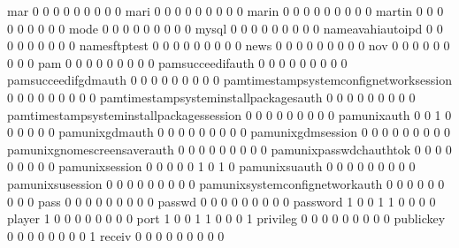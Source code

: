 \documentclass[compress,8pt]{beamer}
\begin{document}
\begin{frame}
\begin{Schunk}
  mar                                        0   0   0   0   0   0   0   0   0
  mari                                       0   0   0   0   0   0   0   0   0
  marin                                      0   0   0   0   0   0   0   0   0
  martin                                     0   0   0   0   0   0   0   0   0
  mode                                       0   0   0   0   0   0   0   0   0
  mysql                                      0   0   0   0   0   0   0   0   0
  nameavahiautoipd                           0   0   0   0   0   0   0   0   0
  namesftptest                               0   0   0   0   0   0   0   0   0
  news                                       0   0   0   0   0   0   0   0   0
  nov                                        0   0   0   0   0   0   0   0   0
  pam                                        0   0   0   0   0   0   0   0   0
  pamsucceedifauth                           0   0   0   0   0   0   0   0   0
  pamsucceedifgdmauth                        0   0   0   0   0   0   0   0   0
  pamtimestampsystemconfignetworksession     0   0   0   0   0   0   0   0   0
  pamtimestampsysteminstallpackagesauth      0   0   0   0   0   0   0   0   0
  pamtimestampsysteminstallpackagessession   0   0   0   0   0   0   0   0   0
  pamunixauth                                0   0   1   0   0   0   0   0   0
  pamunixgdmauth                             0   0   0   0   0   0   0   0   0
  pamunixgdmsession                          0   0   0   0   0   0   0   0   0
  pamunixgnomescreensaverauth                0   0   0   0   0   0   0   0   0
  pamunixpasswdchauthtok                     0   0   0   0   0   0   0   0   0
  pamunixsession                             0   0   0   0   0   1   0   1   0
  pamunixsuauth                              0   0   0   0   0   0   0   0   0
  pamunixsusession                           0   0   0   0   0   0   0   0   0
  pamunixsystemconfignetworkauth             0   0   0   0   0   0   0   0   0
  pass                                       0   0   0   0   0   0   0   0   0
  passwd                                     0   0   0   0   0   0   0   0   0
  password                                   1   0   0   1   1   0   0   0   0
  player                                     1   0   0   0   0   0   0   0   0
  port                                       1   0   0   1   1   0   0   0   1
  privileg                                   0   0   0   0   0   0   0   0   0
  publickey                                  0   0   0   0   0   0   0   0   1
  receiv                                     0   0   0   0   0   0   0   0   0

\end{Schunk}
\end{frame}
\end{document}
